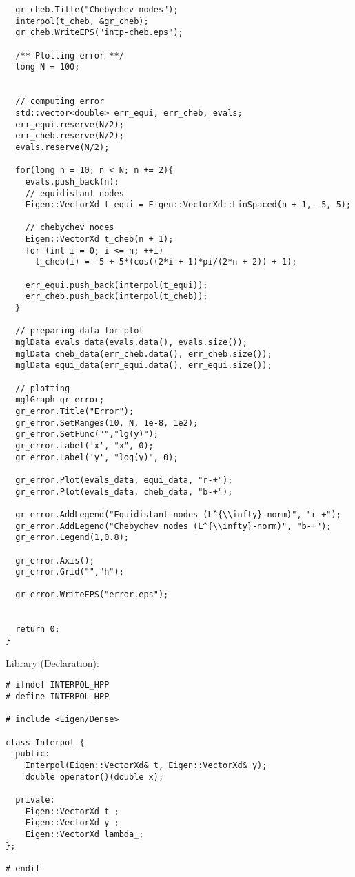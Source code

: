 \documentclass[a4paper]{article}
\begin{document}
\begin{verbatim}
  gr_cheb.Title("Chebychev nodes");
  interpol(t_cheb, &gr_cheb);
  gr_cheb.WriteEPS("intp-cheb.eps");

  /** Plotting error **/
  long N = 100;

  
  // computing error
  std::vector<double> err_equi, err_cheb, evals;
  err_equi.reserve(N/2);
  err_cheb.reserve(N/2);
  evals.reserve(N/2);
  
  for(long n = 10; n < N; n += 2){
    evals.push_back(n);
    // equidistant nodes
    Eigen::VectorXd t_equi = Eigen::VectorXd::LinSpaced(n + 1, -5, 5);
    
    // chebychev nodes
    Eigen::VectorXd t_cheb(n + 1);
    for (int i = 0; i <= n; ++i)
      t_cheb(i) = -5 + 5*(cos((2*i + 1)*pi/(2*n + 2)) + 1);

    err_equi.push_back(interpol(t_equi));
    err_cheb.push_back(interpol(t_cheb));
  }

  // preparing data for plot
  mglData evals_data(evals.data(), evals.size());
  mglData cheb_data(err_cheb.data(), err_cheb.size());
  mglData equi_data(err_equi.data(), err_equi.size());

  // plotting
  mglGraph gr_error;
  gr_error.Title("Error");
  gr_error.SetRanges(10, N, 1e-8, 1e2);
  gr_error.SetFunc("","lg(y)");
  gr_error.Label('x', "x", 0);
  gr_error.Label('y', "log(y)", 0);

  gr_error.Plot(evals_data, equi_data, "r-+");
  gr_error.Plot(evals_data, cheb_data, "b-+");

  gr_error.AddLegend("Equidistant nodes (L^{\\infty}-norm)", "r-+");
  gr_error.AddLegend("Chebychev nodes (L^{\\infty}-norm)", "b-+");
  gr_error.Legend(1,0.8);

  gr_error.Axis();
  gr_error.Grid("","h");

  gr_error.WriteEPS("error.eps");
    

  return 0;
}
\end{verbatim}

Library (Declaration):
\begin{verbatim}
# ifndef INTERPOL_HPP
# define INTERPOL_HPP

# include <Eigen/Dense>

class Interpol {
  public:
    Interpol(Eigen::VectorXd& t, Eigen::VectorXd& y);
    double operator()(double x);

  private:
    Eigen::VectorXd t_;
    Eigen::VectorXd y_;
    Eigen::VectorXd lambda_;
};

# endif
\end{verbatim}
\end{document}

